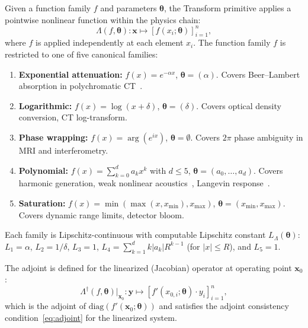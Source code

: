 \documentclass[11pt]{article}
\begin{document}
\begin{definition}[Transform]
\label{def:transform}
Given a function family $f$ and parameters $\boldsymbol{\theta}$, the Transform primitive applies a pointwise nonlinear function within the physics chain:
\begin{equation}
  \Lambda(f, \boldsymbol{\theta}): \mathbf{x} \mapsto [f(x_i; \boldsymbol{\theta})]_{i=1}^{n},
\end{equation}
where $f$ is applied independently at each element $x_i$. The function family $f$ is restricted to one of five canonical families:
\begin{enumerate}
  \item \textbf{Exponential attenuation:} $f(x) = e^{-\alpha x}$, $\boldsymbol{\theta} = (\alpha)$. Covers Beer--Lambert absorption in polychromatic CT~\cite{deman2001metal}.
  \item \textbf{Logarithmic:} $f(x) = \log(x + \delta)$, $\boldsymbol{\theta} = (\delta)$. Covers optical density conversion, CT log-transform.
  \item \textbf{Phase wrapping:} $f(x) = \arg(e^{ix})$, $\boldsymbol{\theta} = \emptyset$. Covers $2\pi$ phase ambiguity in MRI and interferometry.
  \item \textbf{Polynomial:} $f(x) = \sum_{k=0}^{d} a_k x^k$ with $d \leq 5$, $\boldsymbol{\theta} = (a_0, \ldots, a_d)$. Covers harmonic generation, weak nonlinear acoustics~\cite{hamilton1998nonlinear}, Langevin response~\cite{gleich2005mpi}.
  \item \textbf{Saturation:} $f(x) = \min(\max(x, x_{\min}), x_{\max})$, $\boldsymbol{\theta} = (x_{\min}, x_{\max})$. Covers dynamic range limits, detector bloom.
\end{enumerate}
Each family is Lipschitz-continuous with computable Lipschitz constant $L_\Lambda(\boldsymbol{\theta})$: $L_1 = \alpha$, $L_2 = 1/\delta$, $L_3 = 1$, $L_4 = \sum_{k=1}^{d} k|a_k| R^{k-1}$ (for $|x| \leq R$), and $L_5 = 1$.

The adjoint is defined for the linearized (Jacobian) operator at operating point $\mathbf{x}_0$:
\begin{equation}
  \Lambda^\dagger(f, \boldsymbol{\theta})\big|_{\mathbf{x}_0}: \mathbf{y} \mapsto [f'(x_{0,i}; \boldsymbol{\theta}) \cdot y_i]_{i=1}^{n},
\end{equation}
which is the adjoint of $\mathrm{diag}(f'(\mathbf{x}_0; \boldsymbol{\theta}))$ and satisfies the adjoint consistency condition~\eqref{eq:adjoint} for the linearized system.
\end{definition}
\end{document}
